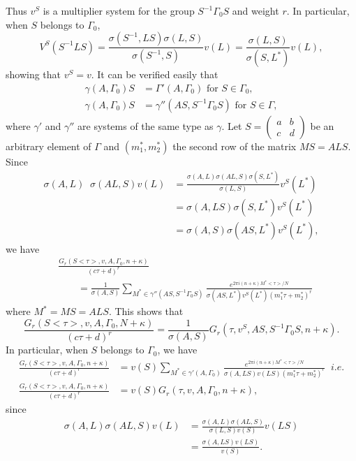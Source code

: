 Thus $v^S$ is a multiplier system for the group $S^{-1}\Gamma_0 S$ and
weight $r$. In particular, when $S$ belongs to $\Gamma_0$,
$$
V^S(S^{-1}LS) = \frac{\sigma(S^{-1},LS)\sigma(L,S)}{\sigma(S^{-1},S)}
v(L) = \frac{\sigma(L,S)}{\sigma(S,L^{\ast})}v(L),
$$\pageoriginale
showing that $v^S=v$. It can be verified easily that 
\begin{align*}
\gamma(A,\Gamma_0) S & = \Gamma'(A,\Gamma_0) \text{ for } S
\in \Gamma_0, \\
\gamma(A,\Gamma_0)S & = \gamma''(AS,S^{-1}\Gamma_0S) \text{ for } S
\in \Gamma,
\end{align*}
where $\gamma'$ and $\gamma''$ are systems of the same type as
$\gamma$. Let $S=\left(\begin{smallmatrix}
  a&b\\c&d \end{smallmatrix}\right)$ be an arbitrary element of
$\Gamma$ and $(m^{\ast}_1, m^{\ast}_2)$ the second row of the matrix
$MS=ALS$. Since 
\begin{align*}
\sigma(A,L) \;\; \sigma(AL,S)v(L) & =
\frac{\sigma(A,L)\sigma(AL,S)\sigma(S,L^{\ast})}{\sigma(L,S)}
v^S(L^{\ast})\\
& = \sigma(A,LS) \sigma(S,L^{\ast})v^S(L^{\ast})\\
& = \sigma(A,S) \sigma(AS,L^{\ast})v^S(L^{\ast}),
\end{align*}
we have 
\begin{align*}
&\frac{G_r(S<\tau>, v,A,\Gamma_0,n+\kappa)}{(c\tau+d)^r}\\
&\qquad=
\frac{1}{\sigma(A,S)} \sum_{M^{\ast}\in \gamma''
  (AS,S^{-1}\Gamma_0 S)} \frac{e^{2\pi
    i(n+\kappa)M^{\ast}<\tau>/N}}{\sigma(AS,L^{\ast})v^S
  (L^{\ast})(m^{\ast}_1\tau + m^{\ast}_2)^r} 
\end{align*}
where $M^{\ast}=MS=ALS$. This shows that
$$
\frac{G_r(S<\tau>, v, A, \Gamma_0, N+\kappa)}{(c\tau+d)^r} =
\frac{1}{\sigma(A,S)} G_r(\tau, v^S, AS, S^{-1}\Gamma_0S, n+\kappa).
$$
In particular, when $S$ belongs to $\Gamma_0$, we have 
{\fontsize{10}{12}\selectfont
\begin{align*}
\frac{G_r(S<\tau>,v,A,\Gamma_0, n+\kappa)}{(c\tau+d)^r} &
=v(S)\sum_{M^{\ast} \in \gamma'(A,\Gamma_0)} \frac{e^{2\pi
    i(n+\kappa)M^{\ast}
    <\tau>/N}}{\sigma(A,LS)v(LS)(m^{\ast}_1\tau+m^{\ast}_2)^r} \;\; i.e.\\
\frac{G_r(S<\tau>, v, A, \Gamma_0, n+\kappa)}{(c\tau+d)^r} & =v(S) G_r
(\tau, v, A, \Gamma_0, n+\kappa), 
\end{align*}}\relax
since \pageoriginale
\begin{align*}
\sigma(A,L)\sigma(AL,S)v(L) & =
\frac{\sigma(A,L)\sigma(AL,S)}{\sigma(L,S)v(S)} v(LS)\\
& =\frac{\sigma(A,LS)v(LS)}{v(S)}.
\end{align*}

